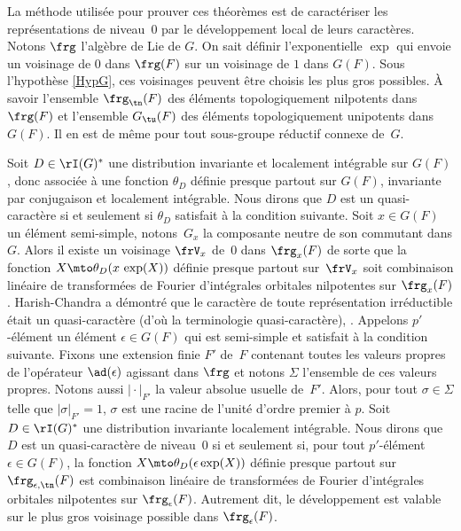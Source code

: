 La méthode utilisée pour prouver ces théorèmes est de caractériser les représentations de niveau~$0$ par le développement local de leurs caractères. Notons $\frg$ l'algèbre de Lie de $G$. On sait définir l'exponentielle $\exp$ qui envoie un voisinage de $0$ dans $\frg(F)$ sur un voisinage de $1$ dans $G(F)$. Sous l'hypothèse \ref{HypG}, ces voisinages peuvent être choisis les plus gros possibles. À savoir l'ensemble $\frg_{\tn}(F)$ des éléments topologiquement nilpotents dans $\frg(F)$ et l'ensemble $G_{\tu}(F)$ des éléments topologiquement unipotents dans $G(F)$. Il en est de même pour tout sous-groupe réductif connexe de~$G$.

Soit $D\in \rI(G)^*$ une distribution invariante et localement intégrable sur
$G(F)$, donc associée à une fonction $\theta_{D}$ définie presque partout sur $G(F)$, invariante par conjugaison et localement intégrable. Nous dirons que $D$ est un quasi-caractère si et seulement si $\theta_{D}$ satisfait à la condition suivante. Soit $x\in G(F)$ un élément semi-simple, notons~$G_{x}$ la composante neutre de son commutant dans $G$. Alors il existe un voisinage $\frV_{x}$ de~$0$ dans $\frg_{x}(F)$ de sorte que la fonction $X\mto \theta_{D}(x\, \exp(X))$ définie presque partout sur~$\frV_{x}$ soit combinaison linéaire de transformées de Fourier d'intégrales orbitales nilpotentes sur $\frg_{x}(F)$. Harish-Chandra a démontré que le caractère de toute représentation irréductible était un quasi-caractère (d'où la terminologie \og quasi-caractère\fg), \cf \cite[Th.\,16.2]{HC}. Appelons $p'$-élément un élément $\epsilon\in G(F)$ qui est semi-simple et satisfait à la condition suivante. Fixons une extension finie $F'$ de~$F$ contenant toutes les valeurs propres de l'opérateur $\ad(\epsilon)$ agissant dans $\frg$ et notons $\Sigma$ l'ensemble de ces valeurs propres. Notons aussi $\vert {\cdot}\vert _{F'}$ la valeur absolue usuelle de~$F'$. Alors, pour tout $\sigma\in \Sigma$ telle que $\vert \sigma\vert _{F'}=1$, $\sigma$ est une racine de l'unité d'ordre premier à $p$. Soit $D\in \rI(G)^*$ une distribution invariante localement intégrable. Nous dirons que $D$ est un quasi-caractère de niveau~$0$ si et seulement si, pour tout $p'$-élément $\epsilon\in G(F)$, la fonction $X\mto \theta_{D}(\epsilon \exp(X))$ définie presque partout sur $\frg_{\epsilon,\tn}(F)$ est combinaison linéaire de transformées de Fourier d'intégrales orbitales nilpotentes sur $\frg_{\epsilon}(F)$. Autrement dit, le développement est valable sur le plus gros voisinage possible dans $\frg_{\epsilon}(F)$.\enlargethispage{\baselineskip}%

